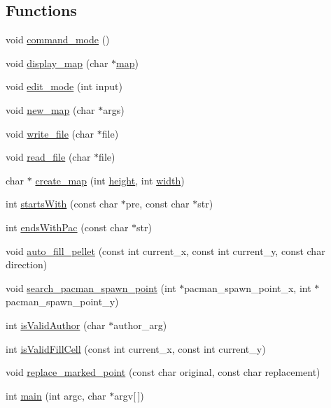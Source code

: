 \subsection*{Functions}
\begin{DoxyCompactItemize}
\item 
void \hyperlink{pacman-level-editor_8c_af892ff919e1c7850c0bd85827b9b648e}{command\-\_\-mode} ()
\item 
void \hyperlink{pacman-level-editor_8c_a77a5d2c2bbebb2204a994de0fc9e066d}{display\-\_\-map} (char $\ast$\hyperlink{pacman-level-editor_8c_a7b00b1bfd666e26484471bd17a74eaa9}{map})
\item 
void \hyperlink{pacman-level-editor_8c_aac01ba2c86cce30701b994bbfbd7e34a}{edit\-\_\-mode} (int input)
\item 
void \hyperlink{pacman-level-editor_8c_a87ec0b28c1d954f4b3192a1fba87130e}{new\-\_\-map} (char $\ast$args)
\item 
void \hyperlink{pacman-level-editor_8c_aaa90b13ddc12479556f96bdaf7cc04a5}{write\-\_\-file} (char $\ast$file)
\item 
void \hyperlink{pacman-level-editor_8c_ae8f3b08f62235bb7c36c368900757640}{read\-\_\-file} (char $\ast$file)
\item 
char $\ast$ \hyperlink{pacman-level-editor_8c_a8a62b1ef65d0697d60b3b762c9cf0799}{create\-\_\-map} (int \hyperlink{pacman-level-editor_8c_ad12fc34ce789bce6c8a05d8a17138534}{height}, int \hyperlink{pacman-level-editor_8c_a2474a5474cbff19523a51eb1de01cda4}{width})
\item 
int \hyperlink{pacman-level-editor_8c_afe756d85f40bd74c8ea6c8722ce012fb}{starts\-With} (const char $\ast$pre, const char $\ast$str)
\item 
int \hyperlink{pacman-level-editor_8c_ad1ba67de662f1a1791ca1cc3a05c402e}{ends\-With\-Pac} (const char $\ast$str)
\item 
void \hyperlink{pacman-level-editor_8c_a0e89020536a88fc330cd9e4aa35799b0}{auto\-\_\-fill\-\_\-pellet} (const int current\-\_\-x, const int current\-\_\-y, const char direction)
\item 
void \hyperlink{pacman-level-editor_8c_aa7287a91b4e306dacc3c9a5b8eb6c3e2}{search\-\_\-pacman\-\_\-spawn\-\_\-point} (int $\ast$pacman\-\_\-spawn\-\_\-point\-\_\-x, int $\ast$pacman\-\_\-spawn\-\_\-point\-\_\-y)
\item 
int \hyperlink{pacman-level-editor_8c_a78839797ab5993e64cbcd43e56e83819}{is\-Valid\-Author} (char $\ast$author\-\_\-arg)
\item 
int \hyperlink{pacman-level-editor_8c_a8b8c0e479a095829ab925c906e493de5}{is\-Valid\-Fill\-Cell} (const int current\-\_\-x, const int current\-\_\-y)
\item 
void \hyperlink{pacman-level-editor_8c_add0fcdabdc016490323e4121bc6cb93c}{replace\-\_\-marked\-\_\-point} (const char original, const char replacement)
\item 
int \hyperlink{pacman-level-editor_8c_a0ddf1224851353fc92bfbff6f499fa97}{main} (int argc, char $\ast$argv\mbox{[}$\,$\mbox{]})
\end{DoxyCompactItemize}
